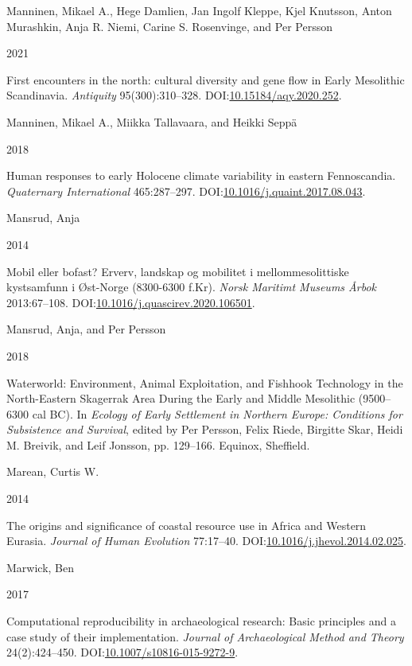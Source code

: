 \documentclass[
  12pt,
  a4paper,
  oneside]{book}
\newlength{\cslhangindent}
\newlength{\csllabelwidth}
\newlength{\cslentryspacingunit} %
\newenvironment{CSLReferences}[2] %
 {%
  \setlength{\parindent}{0pt}
  \ifodd #1
  \let\oldpar\par
  \def\par{\hangindent=\cslhangindent\oldpar}
  \fi
  \setlength{\parskip}{#2\cslentryspacingunit}
 }%
 {}
\newcommand{\CSLBlock}[1]{#1\hfill\break}
\newcommand{\CSLLeftMargin}[1]{\parbox[t]{\csllabelwidth}{#1}}
\newcommand{\CSLRightInline}[1]{\parbox[t]{\linewidth - \csllabelwidth}{#1}\break}
\begin{document}
\begin{CSLReferences}{0}{0}
\leavevmode{}%
\CSLBlock{Manninen, Mikael A., Hege Damlien, Jan Ingolf Kleppe, Kjel Knutsson, Anton Murashkin, Anja R. Niemi, Carine S. Rosenvinge, and Per Persson}
\CSLLeftMargin{ 2021}
\CSLRightInline{{First encounters in the north: cultural diversity and gene flow in Early Mesolithic Scandinavia}. \emph{Antiquity} 95(300):310--328. DOI:\href{https://doi.org/10.15184/aqy.2020.252}{10.15184/aqy.2020.252}.}

\leavevmode{}%
\CSLBlock{Manninen, Mikael A., Miikka Tallavaara, and Heikki Seppä}
\CSLLeftMargin{ 2018}
\CSLRightInline{{Human responses to early Holocene climate variability in eastern Fennoscandia}. \emph{Quaternary International} 465:287--297. DOI:\href{https://doi.org/10.1016/j.quaint.2017.08.043}{10.1016/j.quaint.2017.08.043}.}

\leavevmode{}%
\CSLBlock{Mansrud, Anja}
\CSLLeftMargin{ 2014}
\CSLRightInline{{Mobil eller bofast? Erverv, landskap og mobilitet i mellommesolittiske kystsamfunn i Øst-Norge (8300-6300 f.Kr)}. \emph{Norsk Maritimt Museums Årbok} 2013:67--108. DOI:\href{https://doi.org/10.1016/j.quascirev.2020.106501}{10.1016/j.quascirev.2020.106501}.}

\leavevmode{}%
\CSLBlock{Mansrud, Anja, and Per Persson}
\CSLLeftMargin{ 2018}
\CSLRightInline{{Waterworld: Environment, Animal Exploitation, and Fishhook Technology in the North-Eastern Skagerrak Area During the Early and Middle Mesolithic (9500--6300 cal BC)}. In \emph{{Ecology of Early Settlement in Northern Europe: Conditions for Subsistence and Survival}}, edited by Per Persson, Felix Riede, Birgitte Skar, Heidi M. Breivik, and Leif Jonsson, pp. 129--166. Equinox, Sheffield.}

\leavevmode{}%
\CSLBlock{Marean, Curtis W.}
\CSLLeftMargin{ 2014}
\CSLRightInline{The origins and significance of coastal resource use in Africa and Western Eurasia. \emph{Journal of Human Evolution} 77:17--40. DOI:\href{https://doi.org/10.1016/j.jhevol.2014.02.025}{10.1016/j.jhevol.2014.02.025}.}

\leavevmode{}%
\CSLBlock{Marwick, Ben}
\CSLLeftMargin{ 2017}
\CSLRightInline{Computational reproducibility in archaeological research: Basic principles and a case study of their implementation. \emph{Journal of Archaeological Method and Theory} 24(2):424--450. DOI:\href{https://doi.org/10.1007/s10816-015-9272-9}{10.1007/s10816-015-9272-9}.}


\end{CSLReferences}
\end{document}

